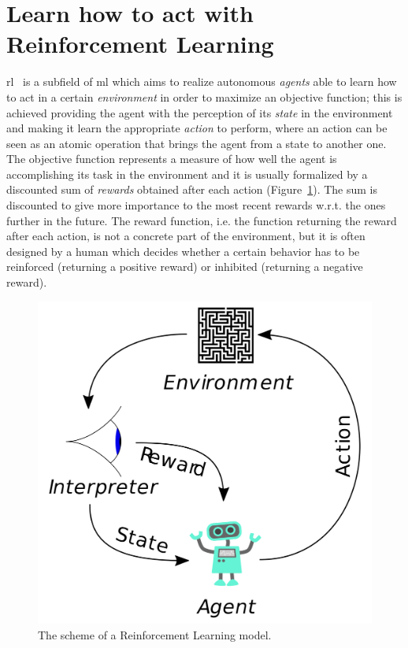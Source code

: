 \section{Learn how to act with Reinforcement Learning}
\gls{rl}~\cite{sutton1998reinforcement} is a subfield of \gls{ml} which aims to realize autonomous \textit{agents} able to learn how to act in a certain \textit{environment} in order to maximize an objective function; this is achieved providing the agent with the perception of its \textit{state} in the environment and making it learn the appropriate \textit{action} to perform, where an action can be seen as an atomic operation that brings the agent from a state to another one. The objective function represents a measure of how well the agent is accomplishing its task in the environment and it is usually formalized by a discounted sum of \textit{rewards} obtained after each action (Figure~\ref{F:rl}). The sum is discounted to give more importance to the most recent rewards w.r.t. the ones further in the future. The reward function, i.e. the function returning the reward after each action, is not a concrete part of the environment, but it is often designed by a human which decides whether a certain behavior has to be reinforced (returning a positive reward) or inhibited (returning a negative reward).

\begin{figure}[t]
\begin{minipage}{\textwidth}
\begin{center}
  \includegraphics[scale=.1]{img/rl.png}
\end{center}
\end{minipage}
\caption[Reinforcement Learning problem scheme]{The scheme of a Reinforcement Learning model.}\label{F:rl}
\end{figure}

